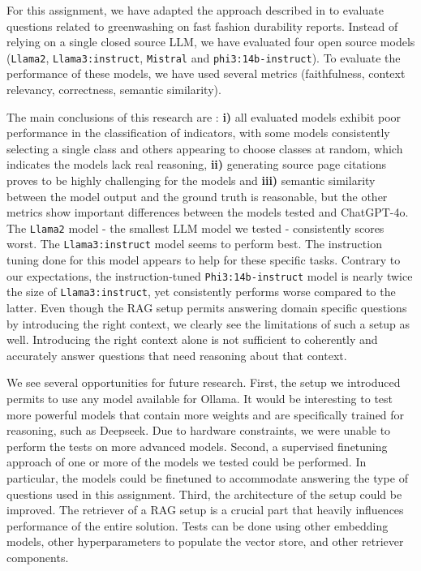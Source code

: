 \documentclass[]{article}
\begin{document}
For this assignment, we have adapted the approach described in \cite{durability} to evaluate questions related to greenwashing on fast fashion durability reports.
Instead of relying on a single closed source LLM, we have evaluated four open source models (\texttt{Llama2}, \texttt{Llama3:instruct}, \texttt{Mistral} and \texttt{phi3:14b-instruct}).
To evaluate the performance of these models, we have used several metrics (faithfulness, context relevancy, correctness, semantic similarity).

The main conclusions of this research are : \textbf{i)} all evaluated models exhibit poor performance in the classification of indicators, with some models consistently selecting a single class and others appearing to choose classes at random, which indicates the models lack real reasoning, \textbf{ii)} generating source page citations proves to be highly challenging for the models and \textbf{iii)} semantic similarity between the model output and the ground truth is reasonable, but the other metrics show important differences between the models tested and ChatGPT-4o.
The \texttt{Llama2} model - the smallest LLM model we tested -  consistently scores worst.
The \texttt{Llama3:instruct} model seems to perform best.
The instruction tuning done for this model appears to help for these specific tasks.
Contrary to our expectations, the instruction-tuned \texttt{Phi3:14b-instruct} model is nearly twice the size of \texttt{Llama3:instruct}, yet consistently performs worse compared to the latter.
Even though the RAG setup permits answering domain specific questions by introducing the right context, we clearly see the limitations of such a setup as well.
Introducing the right context alone is not sufficient to coherently and accurately answer questions that need reasoning about that context.

We see several opportunities for future research.
First, the setup we introduced permits to use any model available for Ollama.
It would be interesting to test more powerful models that contain more weights and are specifically trained for reasoning, such as Deepseek.
Due to hardware constraints, we were unable to perform the tests on more advanced models.
Second, a supervised finetuning approach of one or more of the models we tested could be performed.
In particular, the models could be finetuned to accommodate answering the type of questions used in this assignment.
Third, the architecture of the setup could be improved.
The retriever of a RAG setup is a crucial part that heavily influences performance of the entire solution.
Tests can be done using other embedding models, other hyperparameters to populate the vector store, and other retriever components.
\end{document}

